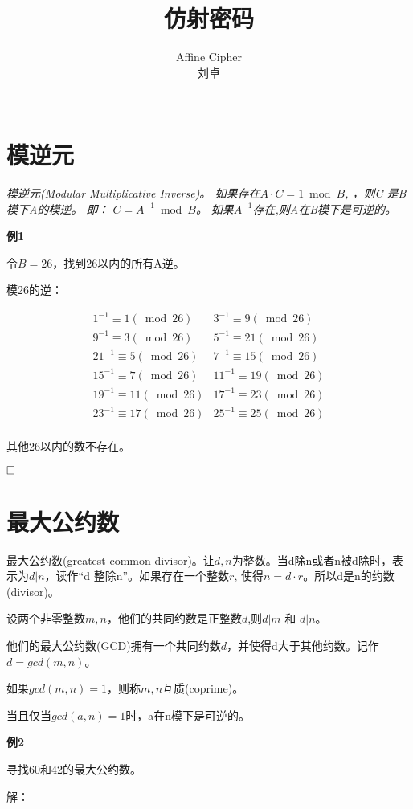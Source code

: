\documentclass{article}
\date{}
\title{仿射密码}
\author{
Affine Cipher\\
 刘卓\\
 \texttt{ } \\
}
\begin{document}
\maketitle

\section{模逆元}
\textit{模逆元(Modular Multiplicative Inverse)。 如果存在$A \cdot C = 1 \bmod B$, ，则C
是B模下A的模逆。 即： $C = A^{-1} \bmod B$。}
\textit{
如果$A^{-1}$存在,则A在B模下是可逆的。
}

\textbf{例1}

令$B = 26$，找到26以内的所有A逆。

模26的逆：

$$
\begin{array}{cc}
 {1^{-1} \equiv 1(\bmod 26)} & 3^{-1} \equiv 9(\bmod 26) \\
 9^{-1} \equiv 3(\bmod 26) & 5^{-1} \equiv 21(\bmod 26) \\ 
 21^{-1} \equiv 5(\bmod 26) & 7^{-1} \equiv 15(\bmod 26) \\ 
 15^{-1} \equiv 7(\bmod 26) & 11^{-1} \equiv 19(\bmod 26) \\
 19^{-1} \equiv 11(\bmod 26) & 17^{-1} \equiv 23(\bmod 26)\\
 23^{-1} \equiv 17(\bmod 26) & 25^{-1} \equiv 25(\bmod 26)\\
\end{array}
$$

其他26以内的数不存在。

$\hfill\square$ 

\section{最大公约数}
最大公约数(greatest common divisor)。让$d,n$为整数。当d除n或者n被d除时，表示为$d|n$，读作“d 整除n”。如果存在一个整数$r$, 使得$n=d \cdot r$。所以d是n的约数(divisor)。

设两个非零整数$m,n$，他们的共同约数是正整数$d$,则$d|m$ 和 $d|n$。

他们的最大公约数(GCD)拥有一个共同约数$d$，并使得d大于其他约数。记作$d = gcd(m,n)$。

如果$gcd(m,n) = 1$，则称$m,n$互质(coprime)。

当且仅当$gcd(a,n) = 1$时，a在n模下是可逆的。


\textbf{例2}

寻找60和42的最大公约数。

解：
\end{document}

